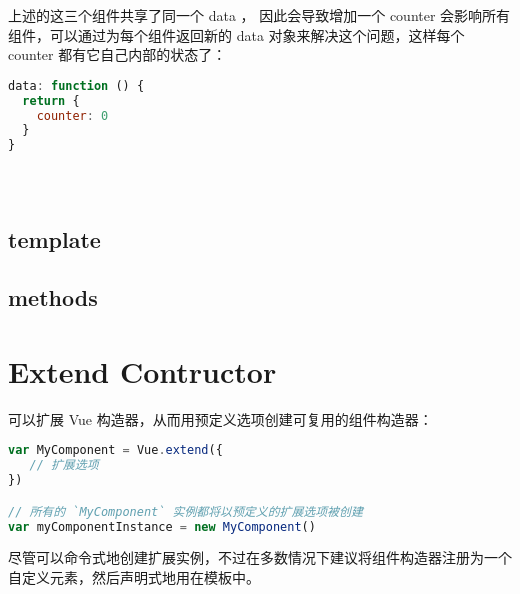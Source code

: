 上述的这三个组件共享了同一个 data ， 因此会导致增加一个 counter 会影响所有组件，可以通过为每个组件返回新的 data 对象来解决这个问题，这样每个 counter 都有它自己内部的状态了：

\begin{lstlisting}[language=JavaScript]
data: function () {
  return {
    counter: 0
  }
}
\end{lstlisting}




\begin{lstlisting}[language=JavaScript]

\end{lstlisting}




\begin{lstlisting}[language=JavaScript]

\end{lstlisting}





\begin{lstlisting}[language=JavaScript]

\end{lstlisting}




\subsection{template}


\subsection{methods}




\section{Extend Contructor}


可以扩展 Vue 构造器，从而用预定义选项创建可复用的组件构造器：


\begin{lstlisting}[language=JavaScript]
var MyComponent = Vue.extend({
   // 扩展选项
})

// 所有的 `MyComponent` 实例都将以预定义的扩展选项被创建
var myComponentInstance = new MyComponent()
\end{lstlisting}


尽管可以命令式地创建扩展实例，不过在多数情况下建议将组件构造器注册为一个自定义元素，然后声明式地用在模板中。


